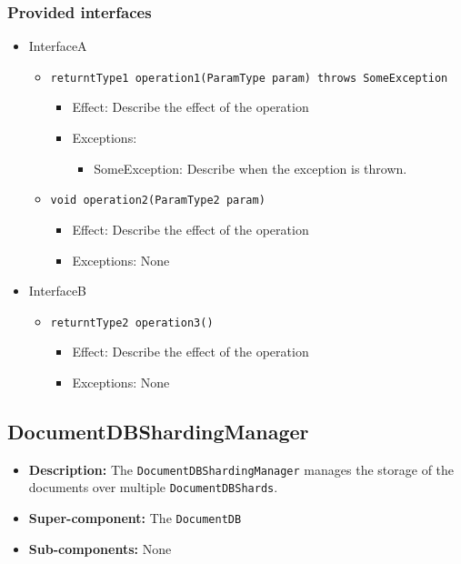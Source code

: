 \documentclass[a4paper,10pt]{article}
\begin{document}
\subsubsection*{Provided interfaces}
\begin{itemize}
    \item InterfaceA
    \begin{itemize}
        \item \texttt{returntType1 operation1(ParamType param) throws SomeException}
        \begin{itemize}
            \item Effect: Describe the effect of the operation
            \item Exceptions:
            \begin{itemize}
                \item SomeException: Describe when the exception is thrown.
            \end{itemize}
		\end{itemize}
        \item \texttt{void operation2(ParamType2 param)}
        \begin{itemize}
            \item Effect: Describe the effect of the operation
            \item Exceptions: None
        \end{itemize}
    \end{itemize}

    \item InterfaceB
    \begin{itemize}
        \item \texttt{returntType2 operation3()}
        \begin{itemize}
            \item Effect: Describe the effect of the operation
            \item Exceptions: None
        \end{itemize}
    \end{itemize}
\end{itemize}

\subsection{DocumentDBShardingManager}
\begin{itemize}
    \item \textbf{Description:} The \texttt{DocumentDBShardingManager} manages the storage of the documents over multiple \texttt{DocumentDBShards}.
    \item \textbf{Super-component:} The \texttt{DocumentDB}
    \item \textbf{Sub-components:} None
\end{itemize}
\end{document}
